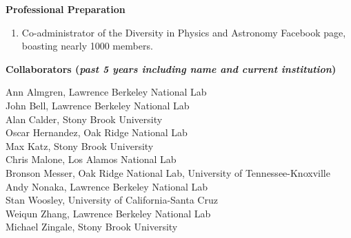 \documentclass[11pt,letterpaper,english]{article}
\begin{document}
\begin{flushleft} {\bf Professional Preparation}
\begin{enumerate}
\item Co-administrator of the Diversity in Physics and Astronomy Facebook page,
  boasting nearly 1000 members. \\

\end{enumerate} 

\vspace{-6pt}
{\bf Collaborators ({\emph{past 5 years including name and current institution}})} 
{\parindent 16pt

Ann Almgren, Lawrence Berkeley National Lab\\
John Bell, Lawrence Berkeley National Lab\\
Alan Calder, Stony Brook University\\
Oscar Hernandez, Oak Ridge National Lab\\
Max Katz, Stony Brook University\\
Chris Malone, Los Alamos National Lab\\
Bronson Messer, Oak Ridge National Lab, University of Tennessee-Knoxville\\
Andy Nonaka, Lawrence Berkeley National Lab\\
Stan Woosley, University of California-Santa Cruz\\
Weiqun Zhang, Lawrence Berkeley National Lab\\
Michael Zingale, Stony Brook University

}


\end{flushleft}
\end{document}
